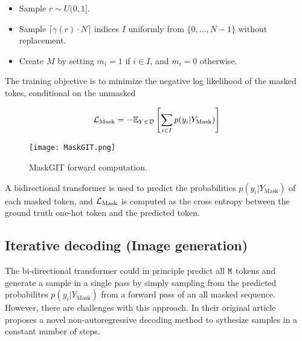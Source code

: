 \documentclass[../../thesis.tex]{subfiles}
\begin{document}
\begin{itemize}
    \item Sample $r \sim U(0,1]$.
    \item Sample $\lceil \gamma(r)\cdot N \rceil$ indices $I$ uniformly from $\{0,\dots,N-1\}$ without replacement. 
    \item Create $M$ by setting $m_i = 1$ if $i\in I$, and $m_i = 0$ otherwise.
\end{itemize}

The training objective is to minimize the negative log likelihood of the masked tokes, conditional on the unmasked

\begin{equation}
    \mathcal{L}_\text{Mask} = -\mathbb{E}_{Y\in \mathcal{D}}\left[\sum_{i \in I} p(y_i|Y_\text{Mask} ) \right]
\end{equation}

\begin{figure}[h]
    \texttt{[image: MaskGIT.png]}
    \centering 
    \label{fig:MaskGIT}
    \caption{MaskGIT forward computation.}
\end{figure}

A bidirectional transformer is used to predict the probabilities $p(y_i|Y_\text{Mask})$ of each masked token, and $\mathcal{L}_\text{Mask}$ is computed as the cross entropy between the ground truth one-hot token and the predicted token.





\subsection{Iterative decoding (Image generation)}

The bi-directional transformer could in principle predict all $\texttt{M}$ tokens and generate a sample in a single pass by simply sampling from the predicted probabilites $p(y_i|Y_\text{Mask})$ from a forward pass of an all masked sequence. However, there are challenges with this approach. In their original article \cite{chang2022maskgit} proposes a novel non-autoregressive decoding method to sythesize samples in a constant number of steps.\newline
\end{document}
